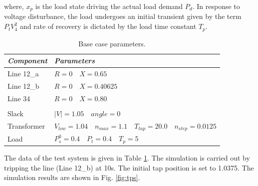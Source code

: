 \documentclass{article}	%
\begin{document}
where, $x_p$ is the load state driving the actual load demand $P_d$. In response to voltage disturbance, the load undergoes an initial transient given by the term $P_t V_4^2$ and rate of recovery is dictated by the load time constant $T_p$.

\begin{table}[H]
  \caption{Base case parameters.}\label{tab:dataps}
  \centering
  \begin{tabular}{p{2cm}l} \toprule
      \emph{Component} & \emph{Parameters} \\
      \midrule
      Line 12\_a & $R=0 \quad X = 0.65$\\
      Line 12\_b & $R=0 \quad X = 0.40625$ \\
      Line 34 & $R=0 \quad X = 0.80$ \\
       &  \\
      Slack & $|V|= 1.05 \quad angle = 0$ \\
      Transformer & $V_{low}=1.04 \quad n_{max} = 1.1 \quad T_{tap} = 20.0 \quad n_{step} = 0.0125 $ \\
    Load & $P_s^0=0.4 \quad P_t = 0.4 \quad T_p = 5  $ \\
      \bottomrule
  \end{tabular}
\end{table}
The data of the test system is given in Table \ref{tab:dataps}. The simulation is carried out by tripping the line (Line 12\_b) at 10s. The initial tap position is set to 1.0375. The simulation results are shown in Fig. \ref{fig:tps}.
%
%
%
\end{document}
